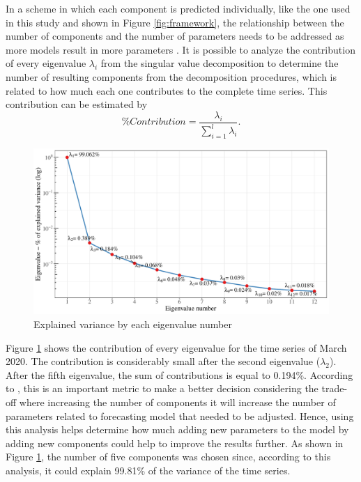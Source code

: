 \begin{enumerate}[start=1,label={\textbf{Step \arabic*:}},wide = 0pt, leftmargin = 3em]
In a scheme in which each component is predicted individually, like the one used in this study and shown in Figure \ref{fig:framework}, the relationship between the number of components and the number of parameters needs to be addressed as more models result in more parameters \cite{moreno2020Multistep}. It is possible to analyze the contribution of every eigenvalue $\lambda_i$ from the singular value decomposition to determine the number of resulting components from the decomposition procedures, which is related to how much each one contributes to the complete time series. This contribution can be estimated by
%
\begin{equation}
    \textit{\%Contribution} = \frac{\lambda_i}{\sum_{i=1}^{l}\lambda_i}.
    \label{eq:eigen}
\end{equation}

\begin{figure}[htb!]
    \centering
    \includegraphics[width=.9\linewidth]{Media/cs3_spectrum.pdf}
    \caption{Explained variance by each eigenvalue number}
    \label{fig:spectrum}
\end{figure}

Figure \ref{fig:spectrum} shows the contribution of every eigenvalue for the time series of March 2020. The contribution is considerably small after the second eigenvalue ($\lambda_2$). After the fifth eigenvalue, the sum of contributions is equal to 0.194\%. According to , this is an important metric to make a better decision considering the trade-off where increasing the number of components it will increase the number of parameters related to forecasting model that needed to be adjusted. Hence, using this analysis helps determine how much adding new parameters to the model by adding new components could help to improve the results further. As shown in Figure \ref{fig:spectrum}, the number of five components was chosen since, according to this analysis, it could explain 99.81\% of the variance of the time series.


\end{enumerate}
